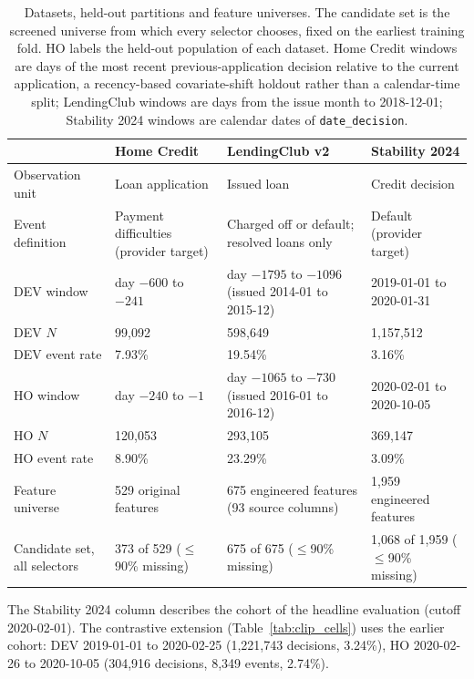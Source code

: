 \documentclass[final,5p,twocolumn]{elsarticle}
\begin{document}
\begin{table}[htbp]
\centering
\footnotesize
\begin{threeparttable}
\caption{Datasets, held-out partitions and feature universes. The candidate set is the screened universe from which every selector chooses, fixed on the earliest training fold. HO labels the held-out population of each dataset. Home Credit windows are days of the most recent previous-application decision relative to the current application, a recency-based covariate-shift holdout rather than a calendar-time split; LendingClub windows are days from the issue month to 2018-12-01; Stability 2024 windows are calendar dates of \texttt{date\_decision}.}
\label{tab:datasets}
\begin{tabular}{@{}lL{29mm}L{31mm}L{31mm}@{}}
\toprule
 & Home Credit & LendingClub v2 & Stability 2024 \\
\midrule
Observation unit & Loan application & Issued loan & Credit decision \\
Event definition & Payment difficulties (provider target) & Charged off or default; resolved loans only & Default (provider target) \\
DEV window & day $-600$ to $-241$ & day $-1795$ to $-1096$ (issued 2014-01 to 2015-12) & 2019-01-01 to 2020-01-31 \\
DEV $N$ & 99,092 & 598,649 & 1,157,512 \\
DEV event rate & 7.93\% & 19.54\% & 3.16\% \\
HO window & day $-240$ to $-1$ & day $-1065$ to $-730$ (issued 2016-01 to 2016-12) & 2020-02-01 to 2020-10-05 \\
HO $N$ & 120,053 & 293,105 & 369,147 \\
HO event rate & 8.90\% & 23.29\% & 3.09\% \\
Feature universe & 529 original features & 675 engineered features (93 source columns) & 1,959 engineered features \\
Candidate set, all selectors & 373 of 529 ($\le$90\% missing) & 675 of 675 ($\le$90\% missing) & 1,068 of 1,959 ($\le$90\% missing) \\
\bottomrule
\end{tabular}
\begin{tablenotes}\footnotesize
\item The Stability 2024 column describes the cohort of the headline evaluation (cutoff 2020-02-01). The contrastive extension (Table~\ref{tab:clip_cells}) uses the earlier cohort: DEV 2019-01-01 to 2020-02-25 (1,221,743 decisions, 3.24\%), HO 2020-02-26 to 2020-10-05 (304,916 decisions, 8,349 events, 2.74\%).
\end{tablenotes}
\end{threeparttable}
\end{table}
\end{document}
